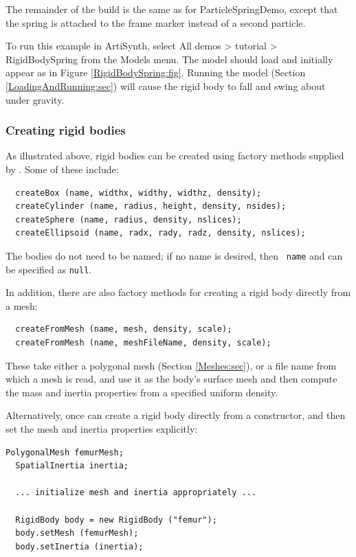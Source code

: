 The remainder of the build is the same as for ParticleSpringDemo,
except that the spring is attached to the frame marker instead of a
second particle.

To run this example in ArtiSynth, select {\sf All demos > tutorial >
RigidBodySpring} from the {\sf Models} menu. The model should load and
initially appear as in Figure \ref{RigidBodySpring:fig}.  Running the
model (Section \ref{LoadingAndRunning:sec}) will cause the rigid body
to fall and swing about under gravity.

\subsubsection{Creating rigid bodies}

As illustrated above, rigid bodies can be created using factory
methods supplied by .
Some of these include:
%
\begin{lstlisting}
  createBox (name, widthx, widthy, widthz, density);
  createCylinder (name, radius, height, density, nsides);
  createSphere (name, radius, density, nslices);
  createEllipsoid (name, radx, rady, radz, density, nslices);
\end{lstlisting}
%
The bodies do not need to be named; if no name is desired, then {\tt
name} and can be specified as {\tt null}.

In addition, there are also
factory methods for creating a rigid body directly from a mesh:
%
\begin{lstlisting}
  createFromMesh (name, mesh, density, scale);
  createFromMesh (name, meshFileName, density, scale);
\end{lstlisting}
%
These take either a polygonal mesh (Section \ref{Meshes:sec}), or a
file name from which a mesh is read, and use it as the body's surface
mesh and then compute the mass and inertia properties from a specified
uniform density.

Alternatively, once can create a rigid body directly from a
constructor, and then set the mesh and inertia properties explicitly:
%
\begin{lstlisting}[]
  PolygonalMesh femurMesh;
  SpatialInertia inertia;

  ... initialize mesh and inertia appropriately ...

  RigidBody body = new RigidBody ("femur");
  body.setMesh (femurMesh);
  body.setInertia (inertia);
\end{lstlisting}
%


